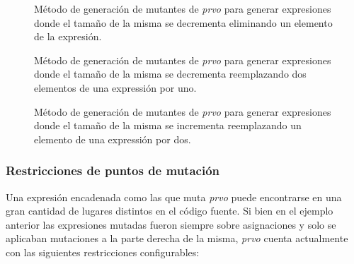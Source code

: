 \begin{figure}
	
	\caption{M\'etodo de generaci\'on de mutantes de \emph{prvo} para generar expresiones donde el tama\~no de la misma se decrementa eliminando un elemento de la expresi\'on.}
	\label{figures.code.prvoMethods.decreaseLength}
\end{figure}

\begin{figure}
	
	\caption{M\'etodo de generaci\'on de mutantes de \emph{prvo} para generar expresiones donde el tama\~no de la misma se decrementa reemplazando dos elementos de una expressi\'on por uno.}
	\label{figures.code.prvoMethods.twoByOne}
\end{figure}

\begin{figure}
	
	\caption{M\'etodo de generaci\'on de mutantes de \emph{prvo} para generar expresiones donde el tama\~no de la misma se incrementa reemplazando un elemento de una expressi\'on por dos.}
	\label{figures.code.prvoMethods.oneByTwo}
\end{figure}

\subsubsection{Restricciones de puntos de mutaci\'on}

Una expresi\'on encadenada como las que muta \emph{prvo} puede encontrarse en una gran cantidad de lugares distintos en el c\'odigo fuente. Si bien en el ejemplo anterior las expresiones mutadas fueron siempre sobre asignaciones y solo se aplicaban mutaciones a la parte derecha de la misma, \emph{prvo} cuenta actualmente con las siguientes restricciones configurables:

